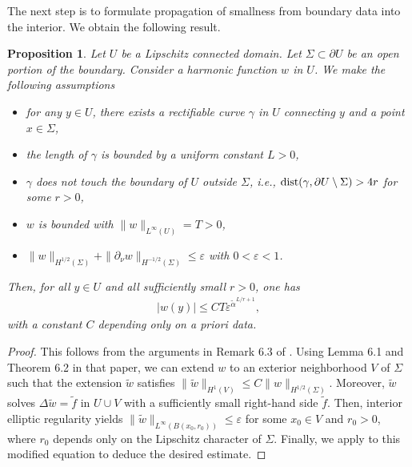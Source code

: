 ﻿\documentclass[11pt,reqno,oneside]{amsart}
\newtheorem{proposition}[theorem]{Proposition}
\theoremstyle{definition}
\theoremstyle{remark}
\newcommand{\dist}{{\rm dist}}
\renewcommand{\a}{\alpha}
\newcommand{\e}{\varepsilon}
\newcommand{\g}{\gamma}
\newcommand{\p}{\partial}
\begin{document}
    \medskip

    The next step is to formulate propagation of smallness from boundary data into the interior. We obtain the following result.

    \begin{proposition}\label{prop:aa2}
        Let $U$ be a Lipschitz connected domain. Let $\Sigma\subset \p U$ be an open portion of the boundary. Consider a harmonic function $w$ in $U$. We make the following assumptions 
        \begin{itemize}
            \item for any $y\in U$, there exists a rectifiable curve $\g$ in $U$ connecting $y$ and a point $x\in \Sigma$,
            \item the length of $\g$ is bounded by a uniform constant $L>0$,
            \item $\g$ does not touch the boundary of $U$ outside $\Sigma$, i.e., $\dist(\g,\p U\setminus \Sigma)>4r$ for some $r>0$,
            \item $w$ is bounded with $\|w\|_{L^\infty(U)}=T>0$,
            \item $\|w\|_{H^{1/2}(\Sigma)}+\|\p_{\nu} w\|_{H^{-1/2}(\Sigma)}\leq \e$ with $0< \e<1$.
        \end{itemize}
        Then, for all $y\in U$ and all sufficiently small $r>0$, one has
        \begin{align}\label{eq:propa-small-holder}
            |w(y)|\leq C T \e^{\widetilde{\a}^{L/r+1}},
        \end{align}
        with a constant $C$ depending only on {\it a priori} data.
    \end{proposition}
    \begin{proof}
        This follows from the arguments in Remark 6.3 of \cite{Alessandrini2009}. Using Lemma 6.1 and Theorem 6.2 in that paper, we can extend $w$ to an exterior neighborhood $V$ of $\Sigma$ such that the extension $\widetilde{w}$ satisfies $\|\widetilde{w}\|_{H^1(V)}\leq C\|w\|_{H^{1/2}(\Sigma)}$. Moreover, $\widetilde{w}$ solves $\Delta \widetilde{w}=\widetilde{f}$ in $U\cup V$ with a sufficiently small right-hand side $\widetilde{f}$. Then, interior elliptic regularity yields $\|\widetilde{w}\|_{L^\infty(B(x_0,r_0))}\leq \e$ for some $x_0\in V$ and $r_0>0$, where $r_0$ depends only on the Lipschitz character of $\Sigma$. Finally, we apply  to this modified equation to deduce the desired estimate.
    \end{proof}
\end{document}
